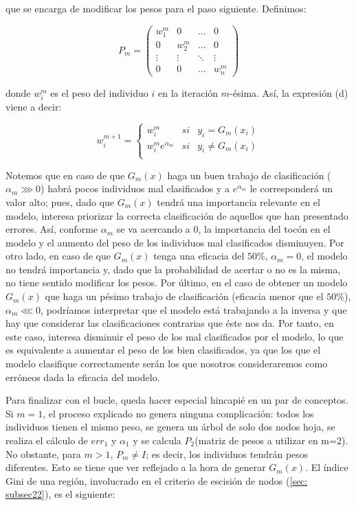 \documentclass[12pt,twoside]{article}
\begin{document}
\noindent
que se encarga de modificar los pesos para el paso siguiente. Definimos:

\begin{equation*}
P_m = 
\begin{pmatrix}
w_1^m & 0 & \dots & 0 \\
0 & w_2^m & \dots & 0 \\
\vdots & \vdots & \ddots & \vdots \\
0 & 0 & \dots & w_n^m
\end{pmatrix}
\end{equation*}

\noindent
donde $w_i^m$ es el peso del individuo $i$ en la iteración $m$-ésima. Así, la expresión (d) viene a decir:

\begin{equation*}
w_i^{m+1} =
\left\{
\begin{array}{crl}
w_i^m & si & y_i = G_m(x_i) \\
w_i^m e^{\alpha_m} & si & y_i \neq G_m(x_i) \\
\end{array}
\right.
\end{equation*}

Notemos que en caso de que $G_m(x)$ haga un buen trabajo de clasificación ($\alpha_m \ggg 0$) habrá pocos individuos mal clasificados y a $e^{\alpha_m}$ le corresponderá un valor alto; pues, dado que $G_m(x)$ tendrá una importancia relevante en el modelo, interesa priorizar la correcta clasificación de aquellos que han presentado errores. Así, conforme $\alpha_m$ se va acercando a 0, la importancia del tocón en el modelo y el aumento del peso de los individuos mal clasificados disminuyen. Por otro lado, en caso de que $G_m(x)$ tenga una eficacia del $50\%$, $\alpha_m = 0$, el modelo no tendrá importancia y, dado que la probabilidad de acertar o no es la misma, no tiene sentido modificar los pesos. Por último, en el caso de obtener un modelo $G_m(x)$ que haga un pésimo trabajo de clasificación (eficacia menor que el $50\%$), $\alpha_m \lll 0$, podríamos interpretar que el modelo está trabajando a la inversa y que hay que considerar las clasificaciones contrarias que éste nos da. Por tanto, en este caso, interesa disminuir el peso de los mal clasificados por el modelo, lo que es equivalente a aumentar el peso de los bien clasificados, ya que los que el modelo clasifique correctamente serán los que nosotros consideraremos como erróneos dada la eficacia del modelo.

Para finalizar con el bucle, queda hacer especial hincapié en un par de conceptos. Si $m=1$, el proceso explicado no genera ninguna complicación: todos los individuos tienen el mismo peso, se genera un árbol de solo dos nodos hoja, se realiza el cálculo de $err_1$ y $\alpha_1$ y se calcula $P_2$(matriz de pesos a utilizar en m=2). No obstante, para $m > 1$, $P_m \neq I$; es decir, los individuos tendrán pesos diferentes. Esto se tiene que ver reflejado a la hora de generar $G_m(x)$. El índice Gini de una región, involucrado en el criterio de escisión de nodos (\ref{sec: subsec22}), es el siguiente:
\end{document}
